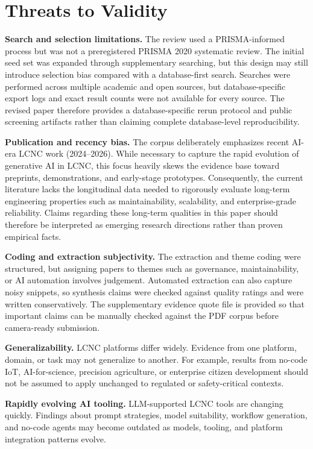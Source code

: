 \documentclass[conference]{IEEEtran}
\begin{document}
\section{Threats to Validity}
\textbf{Search and selection limitations.} The review used a PRISMA-informed process but was not a preregistered PRISMA 2020 systematic review. The initial seed set was expanded through supplementary searching, but this design may still introduce selection bias compared with a database-first search. Searches were performed across multiple academic and open sources, but database-specific export logs and exact result counts were not available for every source. The revised paper therefore provides a database-specific rerun protocol and public screening artifacts rather than claiming complete database-level reproducibility.

\textbf{Publication and recency bias.} The corpus deliberately emphasizes recent AI-era LCNC work (2024--2026). While necessary to capture the rapid evolution of generative AI in LCNC, this focus heavily skews the evidence base toward preprints, demonstrations, and early-stage prototypes. Consequently, the current literature lacks the longitudinal data needed to rigorously evaluate long-term engineering properties such as maintainability, scalability, and enterprise-grade reliability. Claims regarding these long-term qualities in this paper should therefore be interpreted as emerging research directions rather than proven empirical facts.

\textbf{Coding and extraction subjectivity.} The extraction and theme coding were structured, but assigning papers to themes such as governance, maintainability, or AI automation involves judgement. Automated extraction can also capture noisy snippets, so synthesis claims were checked against quality ratings and were written conservatively. The supplementary evidence quote file is provided so that important claims can be manually checked against the PDF corpus before camera-ready submission.

\textbf{Generalizability.} LCNC platforms differ widely. Evidence from one platform, domain, or task may not generalize to another. For example, results from no-code IoT, AI-for-science, precision agriculture, or enterprise citizen development should not be assumed to apply unchanged to regulated or safety-critical contexts.

\textbf{Rapidly evolving AI tooling.} LLM-supported LCNC tools are changing quickly. Findings about prompt strategies, model suitability, workflow generation, and no-code agents may become outdated as models, tooling, and platform integration patterns evolve.
\end{document}
